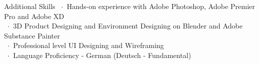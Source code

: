 \documentclass{resumeclass} %
\begin{document}
\begin{rSection}{Additional Skills}
~$\cdot$~Hands-on experience with Adobe Photoshop, Adobe Premier Pro and Adobe XD\\
~$\cdot$~3D Product Designing and Environment Designing on Blender and Adobe Substance Painter\\
~$\cdot$~Professional level UI Designing and Wireframing\\
~$\cdot$~Language Proficiency - German (Deutsch - Fundamental)

\end{rSection}
\end{document}
